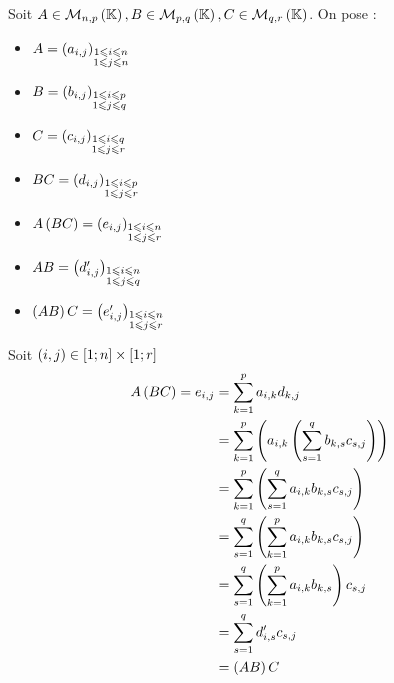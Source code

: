 \begin{dem}
    Soit \(A \in  \mathcal{M}_{n,p}\left(\mathbb{K}\right), B \in  \mathcal{M}_{p,q}\left(\mathbb{K}\right), C \in  \mathcal{M}_{q,r}\left(\mathbb{K}\right) \).
    On pose :
    \begin{itemize}
        \item \(A = \left(a_{i,j}\right)_{\substack {1\leqslant i \leqslant n \\ 1\leqslant j \leqslant n}}\)
        \item \(B = \left(b_{i,j}\right)_{\substack {1\leqslant i \leqslant p \\ 1\leqslant j \leqslant q}}\)
        \item \(C = \left(c_{i,j}\right)_{\substack {1\leqslant i \leqslant q \\ 1\leqslant j \leqslant r}}\)
        \item \(BC = \left(d_{i,j}\right)_{\substack {1\leqslant i \leqslant p \\ 1\leqslant j \leqslant r}} \)
        \item \(A\left(BC\right) = \left(e_{i,j}\right)_{\substack {1\leqslant i \leqslant n \\ 1\leqslant j \leqslant r}}\)
        \item \(AB = \left(d'_{i,j}\right)_{\substack {1\leqslant i \leqslant n \\ 1\leqslant j \leqslant q}}\)
        \item \(\left(AB\right)C = \left(e'_{i,j}\right)_{\substack {1\leqslant i \leqslant n \\ 1\leqslant j \leqslant r}}\)
    \end{itemize}
    Soit \(\left(i,j\right) \in \left[1;n\right]\times \left[1;r\right]\)
    \begin{align*}
        A\left(BC\right) = e_{i,j} &= \sum_{k=1}^p a_{i,k}d_{k,j} \\
                              &= \sum_{k=1}^p \left(a_{i,k} \left(\sum_{s=1}^q b_{k,s}c_{s,j}\right)\right)\\
                              &= \sum_{k=1}^p \left(\sum_{s=1}^q a_{i,k}b_{k,s}c_{s,j} \right)\\
                              &= \sum_{s=1}^q \left(\sum_{k=1}^p a_{i,k}b_{k,s}c_{s,j} \right) \\
                              &= \sum_{s=1}^q \left(\sum_{k=1}^p a_{i,k}b_{k,s}\right)c_{s,j}  \\
                              &= \sum_{s=1}^q d'_{i,s}c_{s,j} \\
                              &= \left(AB\right)C\\
    \end{align*}
\end{dem}

